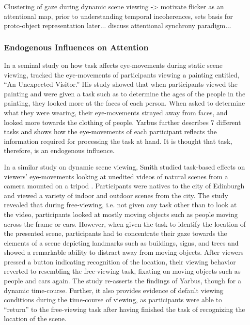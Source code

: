 \documentclass[a4paper,10pt,final]{ThesisStyle}
\begin{document}
Clustering of gaze during dynamic scene viewing -> motivate flicker as an attentional map, prior to understanding temporal incoherences, sets basis for proto-object representation later... discuss attentional synchrony paradigm... 
  	
\subsubsection{Endogenous Influences on Attention}
\label{sec:endogenous-influences}

In a seminal study on how task affects eye-movements during static scene viewing, \cite{Yarbus1967} tracked the eye-movements of participants viewing a painting entitled, ``An Unexpected Visitor.''  His study showed that when participants viewed the painting and were given a task such as to determine the ages of the people in the painting, they looked more at the faces of each person.  When asked to determine what they were wearing, their eye-movements strayed away from faces, and looked more towards the clothing of people.  Yarbus further describes 7 different tasks and shows how the eye-movements of each participant reflects the information required for processing the task at hand.  It is thought that task, therefore, is an endogenous influence.

In a similar study on dynamic scene viewing, Smith studied task-based effects on viewers' eye-movements looking at unedited videos of natural scenes from a camera mounted on a tripod \cite{Smith2011a}.  Participants were natives to the city of Edinburgh and viewed a variety of indoor and outdoor scenes from the city.  The study revealed that during free-viewing, i.e. not given any task other than to look at the video, participants looked at mostly moving objects such as people moving across the frame or cars.  However, when given the task to identify the location of the presented scene, participants had to concentrate their gaze towards the elements of a scene depicting landmarks such as buildings, signs, and trees and showed a remarkable ability to distract away from moving objects.  After viewers pressed a button indicating recognition of the location, their viewing behavior reverted to resembling the free-viewing task, fixating on moving objects such as people and cars again.  The study re-asserts the findings of Yarbus, though for a dynamic time-course.  Further, it also provides evidence of default viewing conditions during the time-course of viewing, as participants were able to ``return'' to the free-viewing task after having finished the task of recognizing the location of the scene.  
\end{document}
